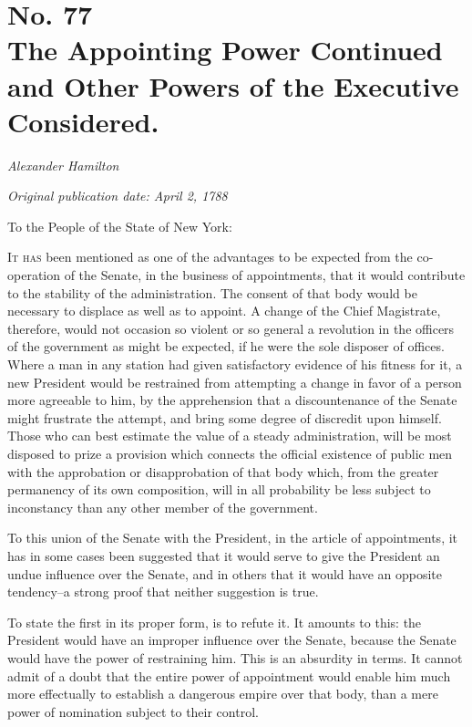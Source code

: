 \chapter[No. 77: The Appointing Power Continued and Other Powers of the Executive Considered.]{No. 77\\ {\small The Appointing Power Continued and Other Powers of the Executive Considered.}}

\textit{Alexander Hamilton}

\textit{Original publication date: April 2, 1788}
\vspace{1cm}

To the People of the State of New York:
\vspace{.4cm}

\textsc{It has} been mentioned as one of the advantages to be expected from the co-operation of the Senate, in the business of appointments, that it would contribute to the stability of the administration. 
The consent of that body would be necessary to displace as well as to appoint. 
A change of the Chief Magistrate, therefore, would not occasion so violent or so general a revolution in the officers of the government as might be expected, if he were the sole disposer of offices. 
Where a man in any station had given satisfactory evidence of his fitness for it, a new President would be restrained from attempting a change in favor of a person more agreeable to him, by the apprehension that a discountenance of the Senate might frustrate the attempt, and bring some degree of discredit upon himself. 
Those who can best estimate the value of a steady administration, will be most disposed to prize a provision which connects the official existence of public men with the approbation or disapprobation of that body which, from the greater permanency of its own composition, will in all probability be less subject to inconstancy than any other member of the government.

To this union of the Senate with the President, in the article of appointments, it has in some cases been suggested that it would serve to give the President an undue influence over the Senate, and in others that it would have an opposite tendency--a strong proof that neither suggestion is true.

To state the first in its proper form, is to refute it. 
It amounts to this: the President would have an improper influence over the Senate, because the Senate would have the power of restraining him. 
This is an absurdity in terms. 
It cannot admit of a doubt that the entire power of appointment would enable him much more effectually to establish a dangerous empire over that body, than a mere power of nomination subject to their control.

